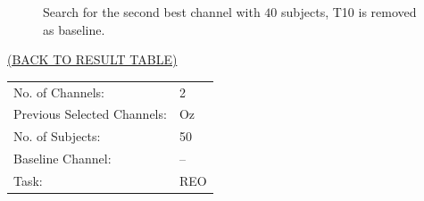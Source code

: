 \documentclass[oneside, a4paper,10pt]{report}
\begin{document}
\begin{figure}[H]
  \caption{Search for the second best channel with $40$ subjects, T10 is removed as baseline.}
  \label{fg:2Ch_S40_B1}
\end{figure}

\newpage

\hspace*{12cm}\hyperlink{tab:TestResults}{(BACK TO RESULT TABLE)}

\bigskip
\bigskip

\begin{tabular}{ll}
  No. of Channels: & 2\\
  Previous Selected Channels: & Oz\\
  No. of Subjects: & 50\\
  Baseline Channel: & --\\
  Task:	& REO 
\end{tabular}

\bigskip
\end{document}

